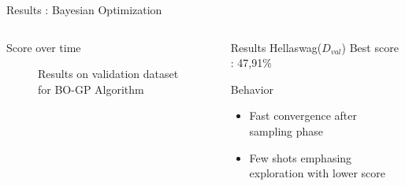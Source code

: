 \begin{frame}{Results : Bayesian Optimization} 
    
    \begin{columns}
    
        \begin{column}{0.6\textwidth}
            \begin{block}{Score over time}
                \begin{figure}
                    \centering
                    
                    \caption{Results on validation dataset for BO-GP Algorithm}
                \end{figure}
            
            \end{block}   
        \end{column}

        \begin{column}{0.4\textwidth}
            \begin{block}{Results}
                Hellaswag($D_{val}$) Best score : 47,91\%        
            \end{block}

            \begin{block}{Behavior}

                \begin{itemize}
                    \item Fast convergence after sampling phase
                    \item Few shots emphasing exploration with lower score
                \end{itemize}
                
                
            \end{block}
             
        \end{column}
    \end{columns}    
\end{frame}

